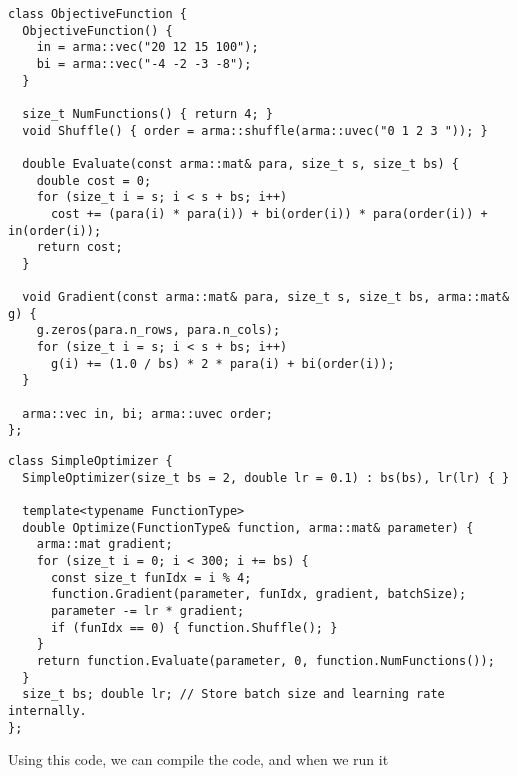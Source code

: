 \documentclass{article}
\begin{document}
\begin{verbatim}
class ObjectiveFunction {
  ObjectiveFunction() {
    in = arma::vec("20 12 15 100");
    bi = arma::vec("-4 -2 -3 -8");
  }

  size_t NumFunctions() { return 4; }
  void Shuffle() { order = arma::shuffle(arma::uvec("0 1 2 3 ")); }

  double Evaluate(const arma::mat& para, size_t s, size_t bs) {
    double cost = 0;
    for (size_t i = s; i < s + bs; i++)
      cost += (para(i) * para(i)) + bi(order(i)) * para(order(i)) + in(order(i));
    return cost;
  }

  void Gradient(const arma::mat& para, size_t s, size_t bs, arma::mat& g) {
    g.zeros(para.n_rows, para.n_cols);
    for (size_t i = s; i < s + bs; i++)
      g(i) += (1.0 / bs) * 2 * para(i) + bi(order(i));
  }

  arma::vec in, bi; arma::uvec order;
};
\end{verbatim}
\begin{verbatim}
class SimpleOptimizer {
  SimpleOptimizer(size_t bs = 2, double lr = 0.1) : bs(bs), lr(lr) { }

  template<typename FunctionType>
  double Optimize(FunctionType& function, arma::mat& parameter) {
    arma::mat gradient;
    for (size_t i = 0; i < 300; i += bs) {
      const size_t funIdx = i % 4;
      function.Gradient(parameter, funIdx, gradient, batchSize);
      parameter -= lr * gradient;
      if (funIdx == 0) { function.Shuffle(); }
    }
    return function.Evaluate(parameter, 0, function.NumFunctions());
  }
  size_t bs; double lr; // Store batch size and learning rate internally.
};
\end{verbatim}
Using this code, we can compile the code, and when we run it
\end{document}
